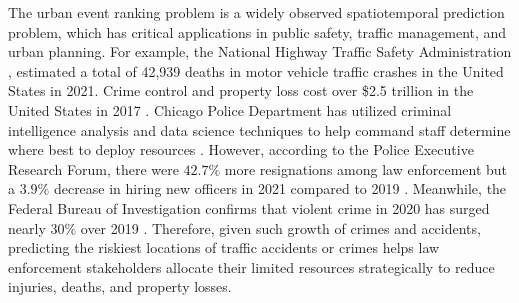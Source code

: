 \documentclass{article}
\begin{document}
The urban event ranking problem is a widely observed spatiotemporal prediction problem, which has critical applications in public safety, traffic management, and urban planning. For example, the National Highway Traffic Safety Administration \cite{2020fatality}, estimated a total of 42,939 deaths in motor vehicle traffic crashes in the United States in 2021. Crime control and property loss cost over \$2.5 trillion in the United States in 2017 \cite{MillerTedR.2021IaCo}. 
Chicago Police Department has utilized criminal intelligence analysis and data science techniques to help command staff determine where best to deploy resources \cite{CPD}. However, according to the Police Executive Research Forum, there were $42.7\%$ more resignations among law enforcement but a $3.9\%$ decrease in hiring new officers in 2021 compared to 2019 \cite{PERF}. Meanwhile, the Federal Bureau of Investigation confirms that violent crime in 2020 has surged nearly $30\%$ over 2019 \cite{FoxNews}. Therefore, given such growth of crimes and accidents, predicting the riskiest locations of traffic accidents or crimes helps law enforcement stakeholders allocate their limited resources strategically to reduce injuries, deaths, and property losses.  


%
\end{document}
